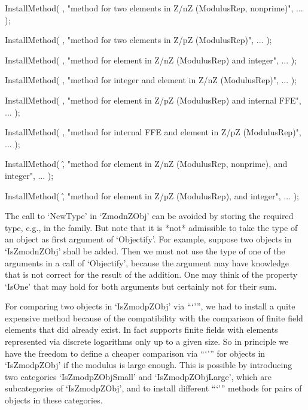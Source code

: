     InstallMethod( \/,
        "method for two elements in Z/nZ (ModulusRep, nonprime)",
        ... );

    InstallMethod( \/,
        "method for two elements in Z/pZ (ModulusRep)",
        ... );

    InstallMethod( \/,
        "method for element in Z/nZ (ModulusRep) and integer",
        ... );

    InstallMethod( \/,
        "method for integer and element in Z/nZ (ModulusRep)",
        ... );

    InstallMethod( \/,
        "method for element in Z/pZ (ModulusRep) and internal FFE",
        ... );

    InstallMethod( \/,
        "method for internal FFE and element in Z/pZ (ModulusRep)",
        ... );

    InstallMethod( \^,
        "method for element in Z/nZ (ModulusRep, nonprime), and integer",
        ... );

    InstallMethod( \^,
        "method for element in Z/pZ (ModulusRep), and integer",
        ... );
\endexample

The call to `NewType' in `ZmodnZObj' can be avoided by storing
the required type, e.g., in the family.
But note that it is *not* admissible to take the type of an object
as first argument of `Objectify'.
For example, suppose two objects in `IsZmodnZObj' shall be added.
Then we must not use the type of one of the arguments in a call of
`Objectify', because the argument may have knowledge that is not
correct for the result of the addition.
One may think of the property `IsOne' that may hold for both
arguments but certainly not for their sum.

For comparing two objects in `IsZmodpZObj' via ```\<''',
we had to install a quite expensive method because of the compatibility
with the comparison of finite field elements that did already exist.
In fact {\GAP} supports finite fields with elements represented via
discrete logarithms only up to a given size.
So in principle we have the freedom to define a cheaper comparison
via ```\<''' for objects in `IsZmodpZObj' if the modulus is large
enough.
This is possible by introducing two categories `IsZmodpZObjSmall'
and `IsZmodpZObjLarge', which are subcategories of `IsZmodpZObj',
and to install different ```\<''' methods for pairs of objects
in these categories.



